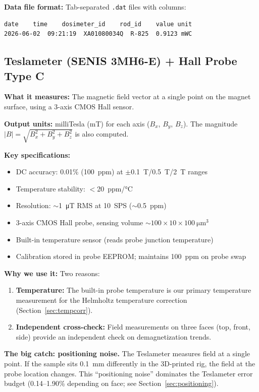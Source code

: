 \documentclass[11pt,letterpaper]{article}
\begin{document}
\textbf{Data file format:} Tab-separated \texttt{.dat} files with columns:

\begin{lstlisting}
date    time    dosimeter_id    rod_id    value unit
2026-06-02  09:21:19  XA01080034Q  R-825  0.9123 mWC
\end{lstlisting}

\subsection{Teslameter (SENIS 3MH6-E) + Hall Probe Type C}
\label{sec:teslameter}

\textbf{What it measures:} The magnetic field vector at a single point on the
magnet surface, using a 3-axis CMOS Hall sensor.

\textbf{Output units:} milliTesla (mT) for each axis ($B_x$, $B_y$, $B_z$).
The magnitude $|B| = \sqrt{B_x^2 + B_y^2 + B_z^2}$ is also computed.

\textbf{Key specifications:}
\begin{itemize}[nosep]
  \item DC accuracy: 0.01\% (\SI{100}{ppm}) at $\pm$\SI{0.1}{\tesla}/\SI{0.5}{\tesla}/\SI{2}{\tesla} ranges
  \item Temperature stability: $<$\SI{20}{ppm/\degreeCelsius}
  \item Resolution: ${\sim}$\SI{1}{\micro\tesla} RMS at \SI{10}{SPS} (${\sim}$\SI{0.5}{ppm})
  \item 3-axis CMOS Hall probe, sensing volume ${\sim}100 \times 10 \times \SI{100}{\micro\meter\cubed}$
  \item Built-in temperature sensor (reads probe junction temperature)
  \item Calibration stored in probe EEPROM; maintains \SI{100}{ppm} on probe swap
\end{itemize}

\textbf{Why we use it:} Two reasons:
\begin{enumerate}[nosep]
  \item \textbf{Temperature:} The built-in probe temperature is our primary
    temperature measurement for the Helmholtz temperature correction
    (Section~\ref{sec:tempcorr}).
  \item \textbf{Independent cross-check:} Field measurements on three faces
    (top, front, side) provide an independent check on demagnetization trends.
\end{enumerate}

\textbf{The big catch: positioning noise.} The Teslameter measures field at a
single point. If the sample sits \SI{0.1}{\milli\meter} differently in the
3D-printed rig, the field at the probe location changes. This ``positioning
noise'' dominates the Teslameter error budget (0.14--1.90\% depending on face;
see Section~\ref{sec:positioning}).
\end{document}
